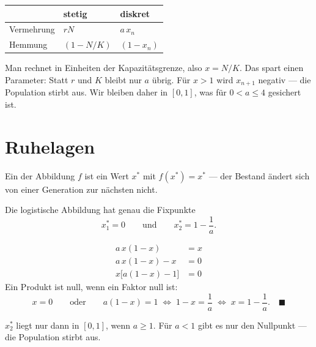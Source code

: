 \begin{merksatz}
\begin{center}
\renewcommand{\arraystretch}{1.5}
\begin{tabular}{@{}P{2.2cm}P{2.8cm}P{3.0cm}@{}}
\toprule
& \textbf{stetig} & \textbf{diskret}\\
\midrule
Vermehrung & $rN$ & $a\,x_n$\\
Hemmung & $(1-N/K)$ & $(1-x_n)$\\
\bottomrule
\end{tabular}
\end{center}

\begin{center}
\begin{minipage}{0.88\textwidth}
\end{minipage}
\end{center}

Man rechnet in Einheiten der Kapazitätsgrenze, also $x = N/K$. Das spart einen Parameter: Statt $r$ und $K$ bleibt nur $a$ übrig. Für $x > 1$ wird $x_{n+1}$ negativ --- die Population stirbt aus. Wir bleiben daher in $[0,1]$, was für $0 < a \le 4$ gesichert ist.
\end{merksatz}

\section{Ruhelagen}

\begin{definition}
Ein  der Abbildung $f$ ist ein Wert $x^{*}$ mit $f(x^{*}) = x^{*}$ --- der Bestand ändert sich von einer Generation zur nächsten nicht.
\end{definition}

\begin{merksatz}
Die logistische Abbildung hat genau die Fixpunkte
\[ x^{*}_1 = 0 \qquad\text{und}\qquad x^{*}_2 = 1 - \frac{1}{a} . \]

\begin{align*}
a\,x(1-x) &= x\\
a\,x(1-x) - x &= 0\\
x\bigl[a(1-x) - 1\bigr] &= 0
\end{align*}
Ein Produkt ist null, wenn ein Faktor null ist:
\[ x = 0 \qquad\text{oder}\qquad a(1-x) = 1 \;\Longleftrightarrow\; 1-x = \frac1a \;\Longleftrightarrow\; x = 1-\frac1a . \quad \blacksquare \]

$x^{*}_2$ liegt nur dann in $[0,1]$, wenn $a \ge 1$. Für $a < 1$ gibt es nur den Nullpunkt --- die Population stirbt aus.
\end{merksatz}

